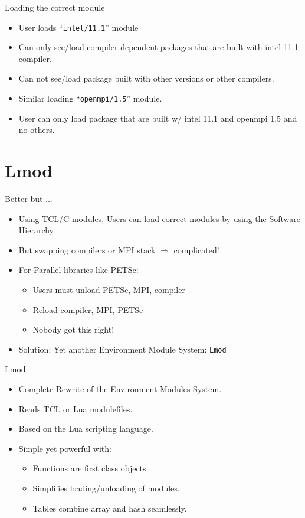 \documentclass{beamer}
\begin{document}
\begin{frame}{Loading the correct module}
  \begin{itemize}
    \item User loads ``\texttt{intel/11.1}'' module
    \item Can only see/load compiler dependent packages that are built with
      intel 11.1 compiler.
    \item Can not see/load package built with other versions or other compilers.
    \item Similar loading ``\texttt{openmpi/1.5}'' module.
    \item User can only load package that are built w/ intel 11.1 and openmpi 1.5 and no others.
  \end{itemize}
\end{frame}


\section{Lmod}

\begin{frame}{Better but ...}
  \begin{itemize}
    \item Using TCL/C modules, Users can load correct modules by using
      the Software Hierarchy.
    \item But swapping compilers or MPI stack $\Rightarrow$ complicated!
    \item For Parallel libraries like PETSc:
      \begin{itemize}
        \item Users must unload PETSc, MPI, compiler
        \item Reload compiler, MPI, PETSc
        \item Nobody got this right!
      \end{itemize}
    \item Solution: Yet another Environment Module System: \texttt{Lmod}
  \end{itemize}
\end{frame}

\begin{frame}{Lmod}
  \begin{itemize}
    \item Complete Rewrite of the Environment Modules System.
    \item Reads TCL or Lua modulefiles.
    \item Based on the Lua scripting language.
    \item Simple yet powerful with:
      \begin{itemize}
        \item Functions are first class objects.
        \item Simplifies loading/unloading of modules.
        \item Tables combine array and hash seamlessly.
      \end{itemize}
  \end{itemize}
\end{frame}
\end{document}
